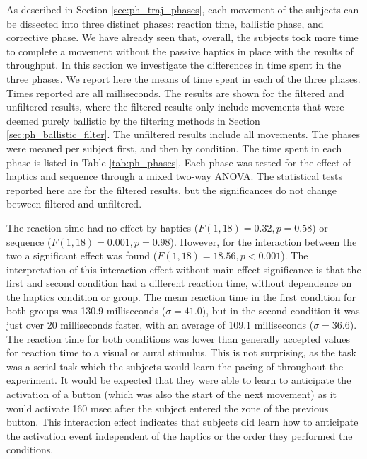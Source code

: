 As described in Section \ref{sec:ph_traj_phases}, each movement of the subjects can be dissected into three distinct phases: reaction time, ballistic phase, and corrective phase.
We have already seen that, overall, the subjects took more time to complete a movement without the passive haptics in place with the results of throughput.
In this section we investigate the differences in time spent in the three phases.
We report here the means of time spent in each of the three phases.
Times reported are all milliseconds.
The results are shown for the filtered and unfiltered results, where the filtered results only include movements that were deemed purely ballistic by the filtering methods in Section \ref{sec:ph_ballistic_filter}.
The unfiltered results include all movements.
The phases were meaned per subject first, and then by condition.
The time spent in each phase is listed in Table \ref{tab:ph_phases}.
Each phase was tested for the effect of haptics and sequence through a mixed two-way ANOVA.
The statistical tests reported here are for the filtered results, but the significances do not change between filtered and unfiltered.

The reaction time had no effect by haptics ($F(1,18)=0.32, p=0.58$) or sequence ($F(1,18)=0.001, p=0.98$).
However, for the interaction between the two a significant effect was found ($F(1,18)=18.56, p<0.001$).
The interpretation of this interaction effect without main effect significance is that the first and second condition had a different reaction time, without dependence on the haptics condition or group.
The mean reaction time in the first condition for both groups was 130.9 milliseconds ($\sigma=41.0$), but in the second condition it was just over 20 milliseconds faster, with an average of 109.1 milliseconds ($\sigma=36.6$).
The reaction time for both conditions was lower than generally accepted values for reaction time to a visual or aural stimulus\cite{}.
This is not surprising, as the task was a serial task which the subjects would learn the pacing of throughout the experiment.
It would be expected that they were able to learn to anticipate the activation of a button (which was also the start of the next movement) as it would activate 160 msec after the subject entered the zone of the previous button.
This interaction effect indicates that subjects did learn how to anticipate the activation event independent of the haptics or the order they performed the conditions.

